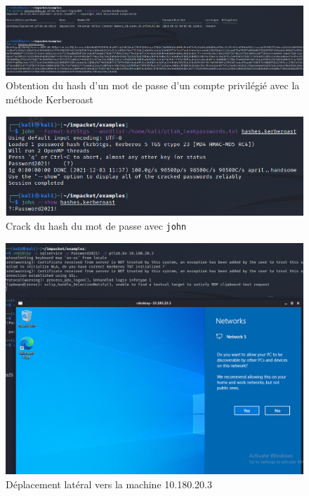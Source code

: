 \documentclass[french,paper=a4,oneside,captions=tableheading]{article}
\begin{document}
\begin{figure}[H]
    \centering
    \includegraphics[width=0.99\linewidth]{images/hashes-kerberoast.png}
    \caption{Obtention du hash d'un mot de passe d'un compte privilégié avec la méthode Kerberoast}
    \label{fig:kerberoast}
\end{figure}

\begin{figure}[H]
    \centering
    \includegraphics[width=0.90\linewidth]{images/crack-password.png}
    \caption{Crack du hash du mot de passe avec \texttt{john}}
    \label{fig:crackpassword}
\end{figure}

\begin{figure}[H]
    \centering
    \includegraphics[width=0.90\linewidth]{images/lateral1.png}
    \caption{Déplacement latéral vers la machine 10.180.20.3}
    \label{fig:lateral1}
\end{figure}
\end{document}
